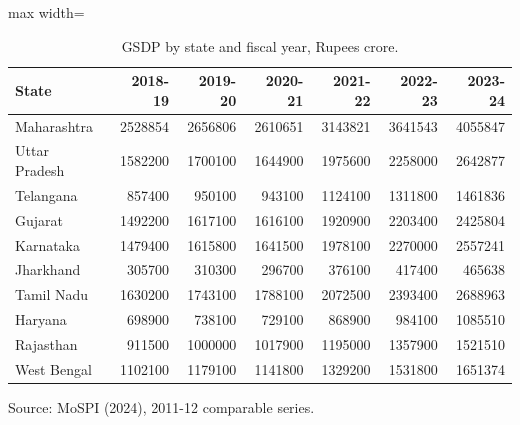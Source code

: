 \documentclass[12pt,a4paper]{article}
\begin{document}
\begin{table}[H]
\centering
\caption{GSDP by state and fiscal year, Rupees crore.}
\label{tab:12}
\footnotesize
\begin{adjustbox}{max width=\textwidth}
\begin{tabular}{@{}lrrrrrr@{}}
\toprule
State & 2018-19 & 2019-20 & 2020-21 & 2021-22 & 2022-23 & 2023-24 \\
\midrule
Maharashtra & 2528854 & 2656806 & 2610651 & 3143821 & 3641543 & 4055847 \\
Uttar Pradesh & 1582200 & 1700100 & 1644900 & 1975600 & 2258000 & 2642877 \\
Telangana & 857400 & 950100 & 943100 & 1124100 & 1311800 & 1461836 \\
Gujarat & 1492200 & 1617100 & 1616100 & 1920900 & 2203400 & 2425804 \\
Karnataka & 1479400 & 1615800 & 1641500 & 1978100 & 2270000 & 2557241 \\
Jharkhand & 305700 & 310300 & 296700 & 376100 & 417400 & 465638 \\
Tamil Nadu & 1630200 & 1743100 & 1788100 & 2072500 & 2393400 & 2688963 \\
Haryana & 698900 & 738100 & 729100 & 868900 & 984100 & 1085510 \\
Rajasthan & 911500 & 1000000 & 1017900 & 1195000 & 1357900 & 1521510 \\
West Bengal & 1102100 & 1179100 & 1141800 & 1329200 & 1531800 & 1651374 \\
\bottomrule
\end{tabular}
\end{adjustbox}
\end{table}

Source: MoSPI (2024), 2011-12 comparable series.
\end{document}
